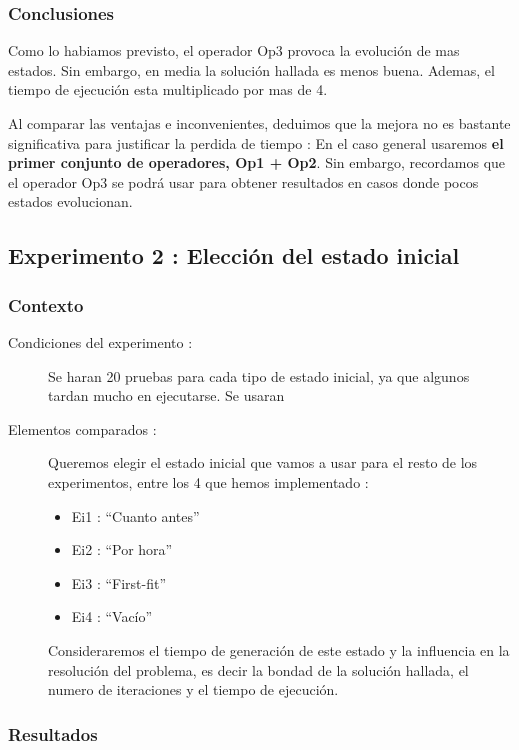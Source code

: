 \documentclass{article}
\begin{document}
\subsubsection{Conclusiones}

Como lo habiamos previsto, el operador Op3 provoca la evolución de mas estados.
Sin embargo, en media la solución hallada es menos buena. Ademas, el tiempo de
ejecución esta multiplicado por mas de 4.

Al comparar las ventajas e inconvenientes, deduimos que la mejora no es bastante
significativa para justificar la perdida de tiempo : En el caso general usaremos
\textbf{el primer conjunto de operadores, Op1 + Op2}. Sin embargo, recordamos
que el operador Op3 se podrá usar para obtener resultados en casos donde pocos
estados evolucionan.

\subsection{Experimento 2 : Elección del estado inicial}

\subsubsection{Contexto}

\begin{description}
\item[Condiciones del experimento :] Se haran 20 pruebas para cada tipo de
estado inicial, ya que algunos tardan mucho en ejecutarse. Se usaran 
\item[Elementos comparados :] Queremos elegir el estado inicial que vamos a usar
para el resto de los experimentos, entre los 4 que hemos implementado :
\begin{itemize}
\item Ei1 : ``Cuanto antes''
\item Ei2 : ``Por hora''
\item Ei3 : ``First-fit''
\item Ei4 : ``Vacío''
\end{itemize}

Consideraremos el tiempo de generación de este estado y la influencia en la
resolución del problema, es decir la bondad de la solución hallada, el numero de
iteraciones y el tiempo de ejecución.
\end{description}

\subsubsection{Resultados}
\end{document}
